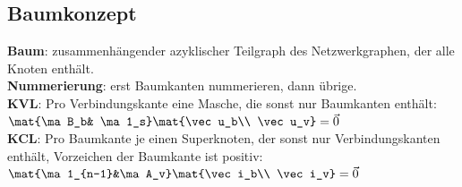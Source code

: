 \documentclass[fs, footer]{latex4ei}
\begin{document}
\begin{multicols*}{4}
{	\subsection{Baumkonzept}
	\textbf{Baum}: zusammenhängender azyklischer Teilgraph des Netzwerkgraphen, der alle Knoten enthält.\\
	\textbf{Nummerierung}: erst Baumkanten nummerieren, dann übrige.\\
	\textbf{KVL}: Pro Verbindungskante eine Masche, die sonst nur Baumkanten enthält:	$\mat{\ma B_b& \ma 1_s}\mat{\vec u_b\\ \vec u_v} = \vec{0}$\\
	\textbf{KCL}: Pro Baumkante je einen Superknoten, der sonst nur Verbindungskanten enthält, Vorzeichen der Baumkante ist positiv: $\mat{\ma 1_{n-1}&\ma A_v}\mat{\vec i_b\\ \vec i_v} = \vec 0$
}


\sectionbox{
}
\end{multicols*}
\end{document}
